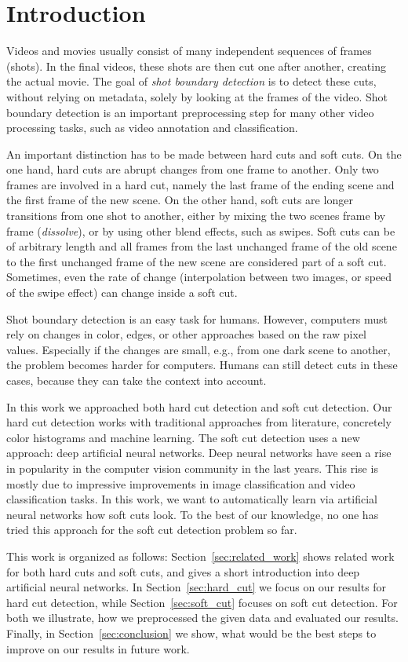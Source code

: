 \section{Introduction}
\label{sec:introduction}

Videos and movies usually consist of many independent sequences of frames (shots).
In the final videos, these shots are then cut one after another, creating the actual movie.
The goal of \emph{shot boundary detection} is to detect these cuts, without relying on metadata, solely by looking at the frames of the video.
Shot boundary detection is an important preprocessing step for many other video processing tasks, such as video annotation and classification.

An important distinction has to be made between hard cuts and soft cuts.
On the one hand, hard cuts are abrupt changes from one frame to another.
Only two frames are involved in a hard cut, namely the last frame of the ending scene and the first frame of the new scene.
On the other hand, soft cuts are longer transitions from one shot to another, either by mixing the two scenes frame by frame (\emph{dissolve}), or by using other blend effects, such as swipes.
Soft cuts can be of arbitrary length and all frames from the last unchanged frame of the old scene to the first unchanged frame of the new scene are considered part of a soft cut.
Sometimes, even the rate of change (interpolation between two images, or speed of the swipe effect) can change inside a soft cut.

Shot boundary detection is an easy task for humans.
However, computers must rely on changes in color, edges, or other approaches based on the raw pixel values.
Especially if the changes are small, e.g., from one dark scene to another, the problem becomes harder for computers.
Humans can still detect cuts in these cases, because they can take the context into account.

In this work we approached both hard cut detection and soft cut detection.
Our hard cut detection works with traditional approaches from literature, concretely color histograms and machine learning.
The soft cut detection uses a new approach: deep artificial neural networks.
Deep neural networks have seen a rise in popularity in the computer vision community in the last years.
This rise is mostly due to impressive improvements in image classification and video classification tasks.
In this work, we want to automatically learn via artificial neural networks how soft cuts look.
To the best of our knowledge, no one has tried this approach for the soft cut detection problem so far.

This work is organized as follows:
Section~\ref{sec:related_work} shows related work for both hard cuts and soft cuts, and gives a short introduction into deep artificial neural networks.
In Section~\ref{sec:hard_cut} we focus on our results for hard cut detection, while Section~\ref{sec:soft_cut} focuses on soft cut detection.
For both we illustrate, how we preprocessed the given data and evaluated our results.
Finally, in Section~\ref{sec:conclusion} we show, what would be the best steps to improve on our results in future work.
